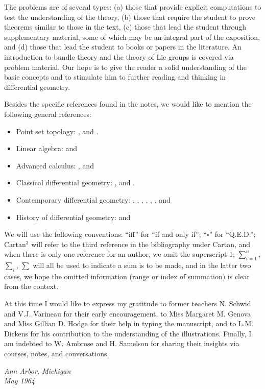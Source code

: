 \documentclass[main]{subfiles}
\begin{document}
The problems are of several types: (a) those that provide explicit computations to test the understanding of the theory, (b) those that require the student to prove theorems similar to those in the text, (c) those that lead the student through supplementary material, some of which may be an integral part of the exposition, and (d) those that lead the student to books or papers in the literature. An introduction to bundle theory and the theory of Lie groups is covered via problem material. Our hope is to give the reader a solid understanding of the basic concepts and to stimulate him to further reading and thinking in differential geometry.

Besides the specific references found in the notes, we would like to mention the following general references: 
\begin{itemize}
    \item Point set topology: \cite{kelley2017general}, \cite{hocking2012topology} and \cite{pervin2014foundations}.
    \item Linear algebra: \cite{halmos2017finite} and \cite{jacobson2013lectures}
    \item Advanced calculus: \cite{buck2003advanced}, \cite{kaplan2003advanced} and \cite{nickerson2013advanced}
    \item Classical differential geometry: \cite{eisenhart2015introduction}, \cite{hilbert1999geometry} and \cite{struik1961lectures}.
    \item Contemporary differential geometry: \cite{auslander2012introduction}, \cite{bishop2011geometry}, \cite{guggenheimer2012differential}, \cite{helgason2012differential}, \cite{kobayashi1963foundations}, \cite{lang2014introduction}, \cite{nomizu2021lie} and \cite{sternberg1964lectures}
    \item History of differential geometry: \cite{struik1961lectures} and \cite{veblen1960foundations}
\end{itemize}

We will use the following conventions: ``iff'' for ``if and only if''; ``$\square$'' for ``Q.E.D.''; Cartan$^3$ will refer to the third reference in the bibliography under Cartan, and when there is only one reference for an author, we omit the superscript 1; $\sum^n_{i=1}$, $\sum_i$, $\sum$ will all be used to indicate a sum is to be made, and in the latter two cases, we hope the omitted information (range or index of summation) is clear from the context.

At this time I would like to express my gratitude to former teachers N. Schwid and V.J. Varineau for their early encouragement, to Miss Margaret M. Genova and Miss Gillian D. Hodge for their help in typing the manuscript, and to L.M. Dickens for his contribution to the understanding of the illustrations. Finally, I am indebted to W. Ambrose and H. Samelson for sharing their insights via courses, notes, and conversations.


{\itshape
\noindent Ann Arbor, Michigan\\
May 1964
}
\end{document}
